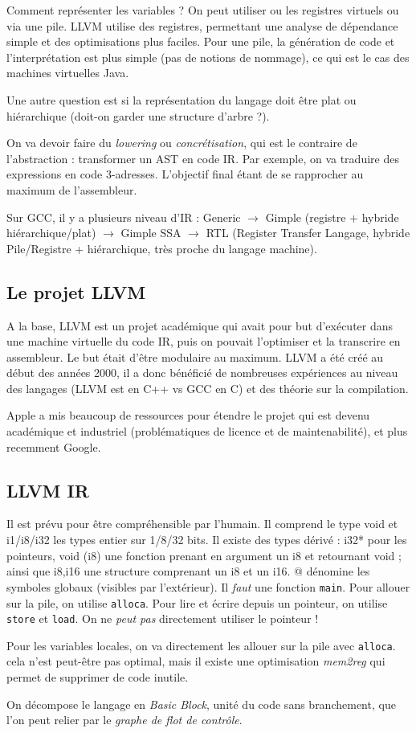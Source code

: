 \documentclass{article}
\begin{document}
Comment représenter les variables ? On peut utiliser ou les registres virtuels ou via une pile. LLVM utilise des registres, permettant une analyse de dépendance simple et des optimisations plus faciles. Pour une pile, la génération de code et l'interprétation est plus simple (pas de notions de nommage), ce qui est le cas des machines virtuelles Java.

Une autre question est si la représentation du langage doit être plat ou hiérarchique (doit-on garder une structure d'arbre ?).
\bigskip

On va devoir faire du \emph{lowering} ou \emph{concrétisation}, qui est le contraire de l'abstraction : transformer un AST en code IR. Par exemple, on va traduire des expressions en code 3-adresses. L'objectif final étant de se rapprocher au maximum de l'assembleur.

Sur GCC, il y a plusieurs niveau d'IR : Generic $\to$ Gimple (registre + hybride hiérarchique/plat) $\to$ Gimple SSA $\to$ RTL (Register Transfer Langage, hybride Pile/Registre + hiérarchique, très proche du langage machine).

\subsection{Le projet LLVM}
A la base, LLVM est un projet académique qui avait pour but d'exécuter dans une machine virtuelle du code IR, puis on pouvait l'optimiser et la transcrire en assembleur. Le but était d'être modulaire au maximum. LLVM a été créé au début des années 2000, il a donc bénéficié de nombreuses expériences au niveau des langages (LLVM est en C++ vs GCC en C) et des théorie sur la compilation.

Apple a mis beaucoup de ressources pour étendre le projet qui est devenu académique et industriel (problématiques de licence et de maintenabilité), et plus recemment Google.


\subsection{LLVM IR}
Il est prévu pour être compréhensible par l'humain. Il comprend le type void et i1/i8/i32 les types entier sur 1/8/32 bits. Il existe des types dérivé : i32* pour les pointeurs, void (i8) une fonction prenant en argument un i8 et retournant void ; ainsi que {i8,i16} une structure comprenant un i8 et un i16. @ dénomine les symboles globaux (visibles par l'extérieur). Il \emph{faut} une fonction \texttt{main}.
Pour allouer sur la pile, on utilise \texttt{alloca}. Pour lire et écrire depuis un pointeur, on utilise \texttt{store} et \texttt{load}. On ne \emph{peut pas} directement utiliser le pointeur !
\bigskip

Pour les variables locales, on va directement les allouer sur la pile avec \texttt{alloca}. cela n'est peut-être pas optimal, mais il existe une optimisation \emph{mem2reg} qui permet de supprimer de code inutile.
\bigskip


On décompose le langage en \emph{Basic Block}, unité du code sans branchement, que l'on peut relier par le \emph{graphe de flot de contrôle}.
\end{document}
